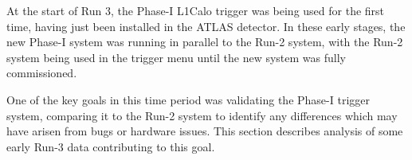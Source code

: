 At the start of Run 3, the Phase-I \ac{L1Calo} trigger was being used for the
first time, having just been installed in the \ac{ATLAS} detector. In these
early stages, the new Phase-I system was running in parallel to the Run-2
system, with the Run-2 system being used in the trigger menu until the
new system was fully commissioned.

One of the key goals in this time period was validating the Phase-I trigger
system, comparing it to the Run-2 system to identify any differences which may
have arisen from bugs or hardware issues. This section describes analysis of
some early Run-3 data contributing to this goal.
